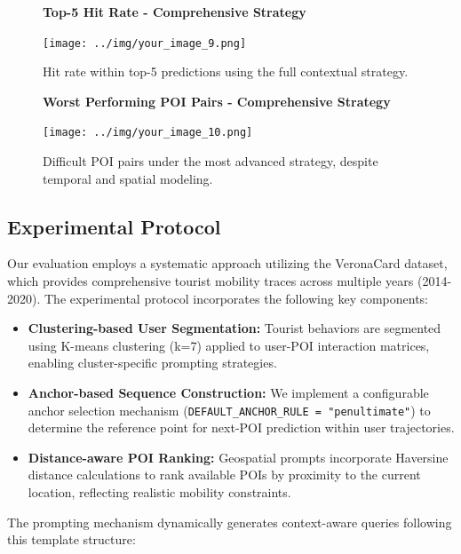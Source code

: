 \documentclass[12pt,a4paper]{article}
\begin{document}
\begin{enumerate}
\begin{figure}[H]
\centering
\textbf{Top-5 Hit Rate - Comprehensive Strategy}\par
\vspace{0.5em}
\texttt{[image: ../img/your\_image\_9.png]}
\caption{Hit rate within top-5 predictions using the full contextual strategy.}
\label{fig:comprehensive_top5}
\end{figure}

\begin{figure}[H]
\centering
\textbf{Worst Performing POI Pairs - Comprehensive Strategy}\par
\vspace{0.5em}
\texttt{[image: ../img/your\_image\_10.png]}
\caption{Difficult POI pairs under the most advanced strategy, despite temporal and spatial modeling.}
\label{fig:comprehensive_worst_pairs}
\end{figure}

\end{enumerate}


\subsection{Experimental Protocol}

Our evaluation employs a systematic approach utilizing the VeronaCard dataset, which provides comprehensive tourist mobility traces across multiple years (2014-2020). The experimental protocol incorporates the following key components:

\begin{itemize}
\item \textbf{Clustering-based User Segmentation:} Tourist behaviors are segmented using K-means clustering (k=7) applied to user-POI interaction matrices, enabling cluster-specific prompting strategies.
\item \textbf{Anchor-based Sequence Construction:} We implement a configurable anchor selection mechanism (\texttt{DEFAULT\_ANCHOR\_RULE = "penultimate"}) to determine the reference point for next-POI prediction within user trajectories.
\item \textbf{Distance-aware POI Ranking:} Geospatial prompts incorporate Haversine distance calculations to rank available POIs by proximity to the current location, reflecting realistic mobility constraints.
\end{itemize}

The prompting mechanism dynamically generates context-aware queries following this template structure:
\end{document}
